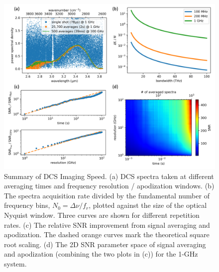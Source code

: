\documentclass{optica-article}
\begin{document}




\begin{figure}[H]
    \centering
    \includegraphics[width=\linewidth]{snr_analysis_v4.png}
    \caption{Summary of DCS Imaging Speed. (a) DCS spectra taken at different averaging times and frequency resolution / apodization windows. (b) The spectra acquisition rate divided by the fundamental number of frequency bins, $N_0=\Delta \nu / f_r$, plotted against the size of the optical Nyquist window. Three curves are shown for different repetition rates. (c) The relative SNR improvement from signal averaging and apodization. The dashed orange curves mark the theoretical square root scaling. (d) The 2D SNR parameter space of signal averaging and apodization (combining the two plots in (c)) for the 1-GHz system.}
    \label{fig:snr_analysis}
\end{figure}
\end{document}
